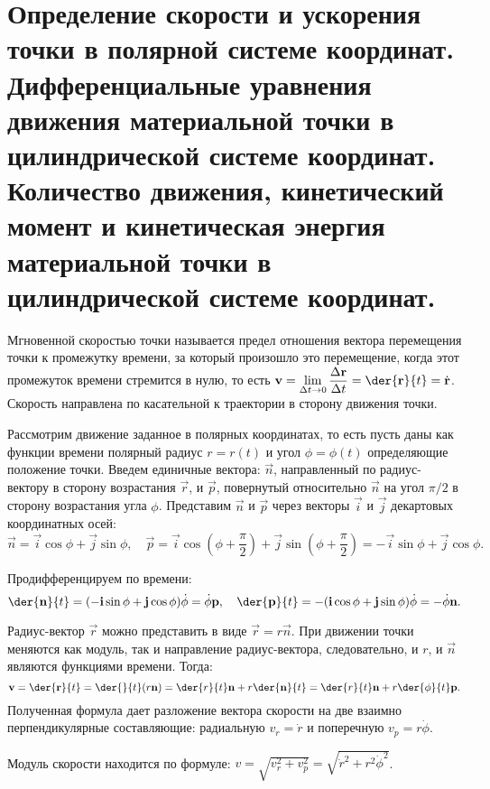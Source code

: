 \chapter{Определение скорости и ускорения точки в полярной системе координат.
Дифференциальные уравнения движения материальной точки в цилиндрической
системе координат. Количество движения, кинетический момент и кинетическая
энергия материальной точки в цилиндрической системе координат.}

Мгновенной скоростью точки называется предел отношения вектора перемещения
точки к промежутку времени, за который произошло это перемещение, когда этот
промежуток времени стремится в нулю, то есть \( \ds \vec{v} = \lim_{\D t\to 0}
\Der{\vec{r}}{t} = \der{\vec{r}}{t} = \dot{\vec{r}} \). Скорость направлена по
касательной к траектории в сторону движения точки.

Рассмотрим движение заданное в полярных координатах, то есть пусть даны как
функции времени полярный радиус \( r = r(t) \) и угол \( \phi = \phi (t) \)
определяющие положение точки. Введем единичные вектора: \( \vec{n} \),
направленный по радиус-вектору в сторону возрастания \( \vec{r} \), и
\( \vec{p} \), повернутый относительно \( \vec{n} \) на угол \( \pi/2 \) в
сторону возрастания угла \( \phi \). Представим \( \vec{n} \) и \( \vec{p} \)
через векторы \( \vec{i} \) и \( \vec{j} \) декартовых координатных осей:
\[
    \vec{n} = \vec{i}\cos\phi + \vec{j}\sin\phi, \quad
    \vec{p} = \vec{i}\cos\left(\phi + \frac{\pi}{2}\right) + \vec{j}\sin\left(
    \phi + \frac{\pi}{2}\right) = -\vec{i}\sin\phi + \vec{j}\cos\phi.
\]

Продифференцируем по времени:
\[
    \der{\vec{n}}{t} = (-\vec{i}\sin\phi + \vec{j}\cos\phi)\dot{\phi} =
    \dot{\phi}\vec{p}, \quad \der{\vec{p}}{t} = -(\vec{i}\cos\phi +
    \vec{j}\sin\phi)\dot{\phi} = -\dot{\phi}\vec{n}.
\]

Радиус-вектор \( \vec{r} \) можно представить в виде \( \vec{r} = r\vec{n} \).
При движении точки меняются как модуль, так и направление радиус-вектора,
следовательно, и \( r \), и \( \vec{n} \) являются функциями времени. Тогда:
\[
    \vec{v} = \der{\vec{r}}{t} = \der{}{t}(r\vec{n}) = \der{r}{t}\vec{n} +
    r\der{\vec{n}}{t} = \der{r}{t}\vec{n} + r\der{\phi}{t}\vec{p}.
\]
Полученная формула дает разложение вектора скорости на две взаимно
перпендикулярные составляющие: радиальную \( v_r = \dot{r} \) и поперечную
\( v_p = r\dot{\phi} \).

Модуль скорости находится по формуле: \( v = \sqrt{v_r^2 + v_p^2} =
\sqrt{\dot{r}^2 + r^2\dot{\phi}^2} \).

